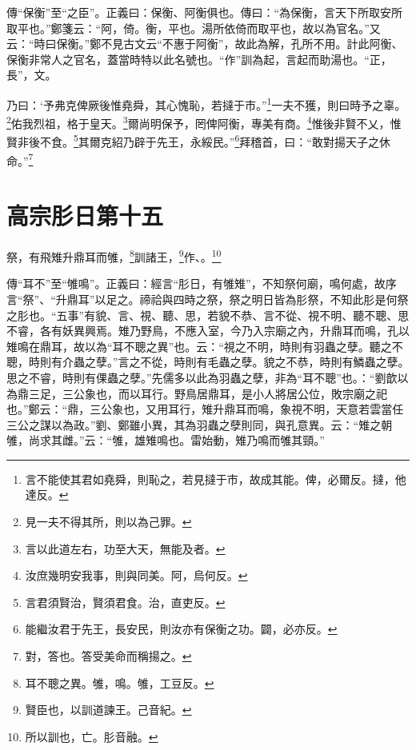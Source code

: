 {\noindent\zhuan{}\fzbyks 傳“保衡”至“之臣”。正義曰：保衡、阿衡俱也。傳曰：“為保衡，言天下所取安所取平也。”鄭箋云：“阿，倚。衡，平也。湯所依倚而取平也，故以為官名。”又云：“時曰保衡。”鄭不見古文云“不惠于阿衡”，故此為解，孔所不用。計此阿衡、保衡非常人之官名，蓋當時特以此名號也。“作”訓為起，言起而助湯也。“正，長”，文。 \par}

乃曰：‘予弗克俾厥後惟堯舜，其心愧恥，若撻于市。”\footnote{言不能使其君如堯舜，則恥之，若見撻于市，故成其能。俾，必爾反。撻，他達反。}一夫不獲，則曰時予之辜。\footnote{見一夫不得其所，則以為己罪。}佑我烈祖，格于皇天。\footnote{言以此道左右，功至大天，無能及者。}爾尚明保予，罔俾阿衡，專美有商。\footnote{汝庶幾明安我事，則與同美。阿，烏何反。}惟後非賢不乂，惟賢非後不食。\footnote{言君須賢治，賢須君食。治，直吏反。}其爾克紹乃辟于先王，永綏民。”\footnote{能繼汝君于先王，長安民，則汝亦有保衡之功。闢，必亦反。}拜稽首，曰：“敢對揚天子之休命。”\footnote{對，答也。答受美命而稱揚之。}

\section{高宗肜日第十五}


祭，有飛雉升鼎耳而雊，\footnote{耳不聰之異。雊，鳴。雊，工豆反。}訓諸王，\footnote{賢臣也，以訓道諫王。己音紀。}作、。\footnote{所以訓也，亡。肜音融。}


{\noindent\zhuan{}\fzbyks 傳“耳不”至“雊鳴”。正義曰：經言“肜日，有雊雉”，不知祭何廟，鳴何處，故序言“祭”、“升鼎耳”以足之。禘祫與四時之祭，祭之明日皆為肜祭，不知此肜是何祭之肜也。“五事”有貌、言、視、聽、思，若貌不恭、言不從、視不明、聽不聰、思不睿，各有妖異興焉。雉乃野鳥，不應入室，今乃入宗廟之內，升鼎耳而鳴，孔以雉鳴在鼎耳，故以為“耳不聰之異”也。云：“視之不明，時則有羽蟲之孽。聽之不聰，時則有介蟲之孽。”言之不從，時則有毛蟲之孽。貌之不恭，時則有鱗蟲之孽。思之不睿，時則有倮蟲之孽。”先儒多以此為羽蟲之孽，非為“耳不聰”也。：“劉歆以為鼎三足，三公象也，而以耳行。野鳥居鼎耳，是小人將居公位，敗宗廟之祀也。”鄭云：“鼎，三公象也，又用耳行，雉升鼎耳而鳴，象視不明，天意若雲當任三公之謀以為政。”劉、鄭雖小異，其為羽蟲之孽則同，與孔意異。云：“雉之朝雊，尚求其雌。”云：“雊，雄雉鳴也。雷始動，雉乃鳴而雊其頸。” \par}

